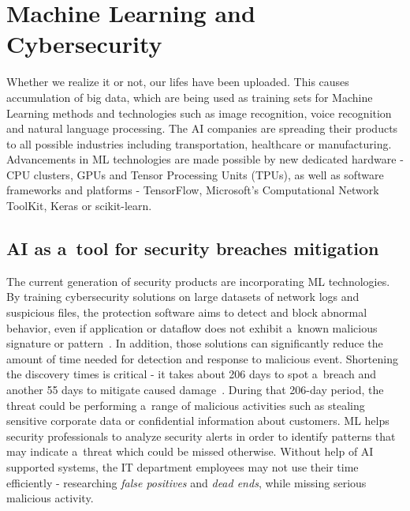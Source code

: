 \chapter{Machine Learning and Cybersecurity}\label{ch:machine-learning-and-cybersecurity}

Whether we realize it or not, our lifes have been uploaded.
This causes accumulation of big data, which are being used as training sets for Machine Learning methods and technologies such as image recognition, voice recognition and natural language processing.
The AI companies are spreading their products to all possible industries including transportation, healthcare or manufacturing.
Advancements in ML technologies are made possible by new dedicated hardware - CPU clusters, GPUs and Tensor Processing Units (TPUs), as well as software frameworks and platforms - TensorFlow, Microsoft's Computational Network ToolKit, Keras or scikit-learn.


\section{AI as a~tool for security breaches mitigation}\label{sec:ai-as-a-tool-for-security-breaches-mitigation}

The current generation of security products are incorporating ML technologies.
By training cybersecurity solutions on large datasets of network logs and suspicious files, the protection software aims to detect and block abnormal behavior, even if application or dataflow does not exhibit a~known malicious signature or pattern~\cite{blog:protocol_ai}.
In addition, those solutions can significantly reduce the amount of time needed for detection and response to malicious event.
Shortening the discovery times is critical - it takes about 206 days to spot a~breach and another 55 days to mitigate caused damage~\cite{blog:attack_detection_time}.
During that 206-day period, the threat could be performing a~range of malicious activities such as stealing sensitive corporate data or confidential information about customers.
ML helps security professionals to analyze security alerts in order to identify patterns that may indicate a~threat which could be missed otherwise.
Without help of AI supported systems, the IT department employees may not use their time efficiently - researching \textit{false positives} and \textit{dead ends}, while missing serious malicious activity.

